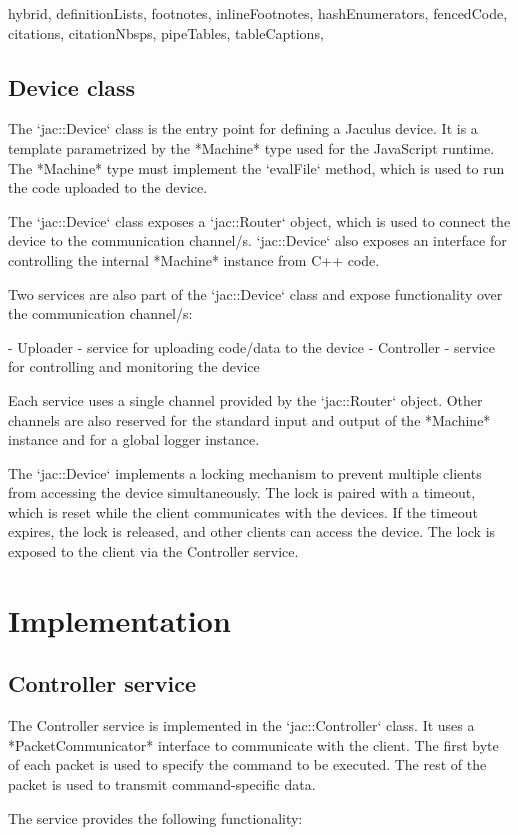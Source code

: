 \documentclass[
  digital,
  oneside,
  nosansbold,
  nocolorbold,
  lof,
  lot
]{fithesis4}
\begin{document}
\begin{markdown*}{%
  hybrid,
  definitionLists,
  footnotes,
  inlineFootnotes,
  hashEnumerators,
  fencedCode,
  citations,
  citationNbsps,
  pipeTables,
  tableCaptions,
}
\subsection{Device class}

The `jac::Device` class is the entry point for defining a Jaculus device. It is a template parametrized by the *Machine* type used for the JavaScript runtime. The *Machine* type must implement the `evalFile` method, which is used to run the code uploaded to the device.

The `jac::Device` class exposes a `jac::Router` object, which is used to connect the device to the communication channel/s. `jac::Device` also exposes an interface for controlling the internal *Machine* instance from C++ code.

Two services are also part of the `jac::Device` class and expose functionality over the communication channel/s:

  - Uploader - service for uploading code/data to the device
  - Controller - service for controlling and monitoring the device

Each service uses a single channel provided by the `jac::Router` object. Other channels are also reserved for the standard input and output of the *Machine* instance and for a global logger instance.

The `jac::Device` implements a locking mechanism to prevent multiple clients from accessing the device simultaneously. The lock is paired with a timeout, which is reset while the client communicates with the devices. If the timeout expires, the lock is released, and other clients can access the device. The lock is exposed to the client via the Controller service.


\section{Implementation}

\subsection{Controller service}

The Controller service is implemented in the `jac::Controller` class. It uses a *PacketCommunicator* interface to communicate with the client. The first byte of each packet is used to specify the command to be executed. The rest of the packet is used to transmit command-specific data.

The service provides the following functionality:


\end{markdown*}
\end{document}
